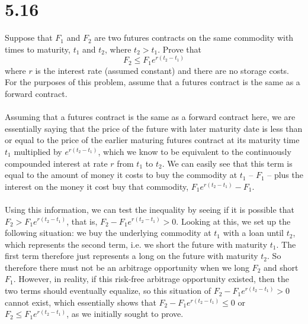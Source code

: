 \documentclass{article}
\begin{document}
{\Large 

\section*{5.16}
Suppose that \(F_1\) and \(F_2\) are two futures contracts on the same commodity with times to maturity, \(t_1\) and \(t_2\), where \(t_2 > t_1\). Prove that 
\[
  F_2 \leq F_1 e^{r(t_2 - t_1)}
\]
where \(r\) is the interest rate (assumed constant) and there are no storage costs. For the purposes of this problem, assume that a futures contract is the same as a forward contract. \\ \\
Assuming that a futures contract is the same as a forward contract here, we are essentially saying that the price of the future with later maturity date is less than or equal to the price of the earlier maturing futures contract at its maturity time \(t_1\) multiplied by \(e^{r(t_2 - t_1)}\), which we know to be equivalent to the continuously compounded interest at rate \(r\) from \(t_1\) to \(t_2\). We can easily see that this term is equal to the amount of money it costs to buy the commodity at \(t_1\) -- \(F_1\) -- plus the interest on the money it cost buy that commodity, \(F_1e^{r(t_2 - t_1)} - F_1\). \\ \\
Using this information, we can test the inequality by seeing if it is possible that \(F_2 > F_1e^{r(t_2 - t_1)}\), that is, \(F_2 - F_1e^{r(t_2 - t_1)} > 0\). Looking at this, we set up the following situation: we buy the underlying commodity at \(t_1\) with a loan until \(t_2\), which represents the second term, i.e. we short the future with maturity \(t_1\). The first term therefore just represents a long on the future with maturity \(t_2\). So therefore there must not be an arbitrage opportunity when we long \(F_2\) and short \(F_1\). However, in reality, if this risk-free arbitrage opportunity existed, then the two terms should eventually equalize, so this situation of \(F_2 - F_1e^{r(t_2 - t_1)} > 0\) cannot exist, which essentially shows that \(F_2 - F_1e^{r(t_2 - t_1)} \leq 0\) or \(F_2 \leq F_1e^{r(t_2 - t_1)}\), as we initially sought to prove.

}
\end{document}
